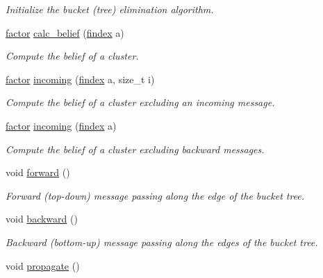 \begin{DoxyCompactItemize}
\begin{DoxyCompactList}\small\item\em Initialize the bucket (tree) elimination algorithm. \end{DoxyCompactList}\item 
\hyperlink{classmerlin_1_1factor}{factor} \hyperlink{classmerlin_1_1bte_a65039b42afd578ea32d3d9e06397081b}{calc\+\_\+belief} (\hyperlink{classmerlin_1_1bte_a9a8220f4a0d833a5b0044a05aecf21d3}{findex} a)
\begin{DoxyCompactList}\small\item\em Compute the belief of a cluster. \end{DoxyCompactList}\item 
\hyperlink{classmerlin_1_1factor}{factor} \hyperlink{classmerlin_1_1bte_ae3e8a7bacdd70fcfc65b2eb53ef978ed}{incoming} (\hyperlink{classmerlin_1_1bte_a9a8220f4a0d833a5b0044a05aecf21d3}{findex} a, size\+\_\+t i)
\begin{DoxyCompactList}\small\item\em Compute the belief of a cluster excluding an incoming message. \end{DoxyCompactList}\item 
\hyperlink{classmerlin_1_1factor}{factor} \hyperlink{classmerlin_1_1bte_a317c1bf7b30d0f909c4967a8f6aad7c8}{incoming} (\hyperlink{classmerlin_1_1bte_a9a8220f4a0d833a5b0044a05aecf21d3}{findex} a)
\begin{DoxyCompactList}\small\item\em Compute the belief of a cluster excluding backward messages. \end{DoxyCompactList}\item 
void \hyperlink{classmerlin_1_1bte_a778a4ce01d5bda3a5ca6668f12539192}{forward} ()\hypertarget{classmerlin_1_1bte_a778a4ce01d5bda3a5ca6668f12539192}{}\label{classmerlin_1_1bte_a778a4ce01d5bda3a5ca6668f12539192}

\begin{DoxyCompactList}\small\item\em Forward (top-\/down) message passing along the edge of the bucket tree. \end{DoxyCompactList}\item 
void \hyperlink{classmerlin_1_1bte_a3ed213fe5359d105c053a79e44f34045}{backward} ()\hypertarget{classmerlin_1_1bte_a3ed213fe5359d105c053a79e44f34045}{}\label{classmerlin_1_1bte_a3ed213fe5359d105c053a79e44f34045}

\begin{DoxyCompactList}\small\item\em Backward (bottom-\/up) message passing along the edges of the bucket tree. \end{DoxyCompactList}\item 
void \hyperlink{classmerlin_1_1bte_ae228794a68eab97db14df8e4ca04ac11}{propagate} ()\hypertarget{classmerlin_1_1bte_ae228794a68eab97db14df8e4ca04ac11}{}\label{classmerlin_1_1bte_ae228794a68eab97db14df8e4ca04ac11}


\end{DoxyCompactItemize}
